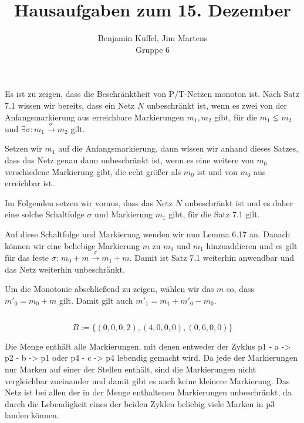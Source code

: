 \documentclass[10pt,a4paper,oneside,ngerman,numbers=noenddot]{scrartcl}
\begin{document}
\author{Benjamin Kuffel, Jim Martens\\Gruppe 6}
\title{Hausaufgaben zum 15. Dezember}
\maketitle

\setcounter{section}{2}
\section{} %
\subsection{}
Es ist zu zeigen, dass die Beschränktheit von P/T-Netzen monoton ist. Nach Satz 7.1 wissen wir bereits, dass ein Netz \(N\) unbeschränkt ist, wenn es zwei von der Anfangsmarkierung aus erreichbare Markierungen \(m_1,m_2\) gibt, für die \(m_1 \lneq m_2\) und \(\exists \sigma : m_1 \overset{\sigma}{\rightarrow} m_2\) gilt.

Setzen wir \(m_{1}\) auf die Anfangsmarkierung, dann wissen wir anhand dieses Satzes, dass das Netz genau dann unbeschränkt ist, wenn es eine weitere von \(m_0\) verschiedene Markierung gibt, die echt größer als \(m_0\) ist und von \(m_0\) aus erreichbar ist.

Im Folgenden setzen wir voraus, dass das Netz \(N\) unbeschränkt ist und es daher eine solche Schaltfolge \(\sigma\) und Markierung \(m_1\) gibt, für die Satz 7.1 gilt.

Auf diese Schaltfolge und Markierung wenden wir nun Lemma 6.17 an. Danach können wir eine beliebige Markierung \(m\) zu \(m_0\) und \(m_1\) hinzuaddieren und es gilt für das feste \(\sigma\): \(m_0 + m \overset{\sigma}{\rightarrow} m_1 + m\). Damit ist Satz 7.1 weiterhin anwendbar und das Netz weiterhin unbeschränkt.

Um die Monotonie abschließend zu zeigen, wählen wir das \(m\) so, dass \(m'_0 = m_0 + m\) gilt. Damit gilt auch \(m'_1 = m_1 + m'_0 - m_0\).

\subsection{}
\[
	B := \{(0,0,0,2),(4,0,0,0),(0,6,0,0)\}
\]

Die Menge enthält alle Markierungen, mit denen entweder der Zyklus p1 - a -> p2 - b -> p1 oder p4 - c -> p4 lebendig gemacht wird. Da jede der Markierungen nur Marken auf einer der Stellen enthält, sind die Markierungen nicht vergleichbar zueinander und damit gibt es auch keine kleinere Markierung. Das Netz ist bei allen der in der Menge enthaltenen Markierungen unbeschränkt, da durch die Lebendigkeit eines der beiden Zyklen beliebig viele Marken in p3 landen können.
\end{document}
